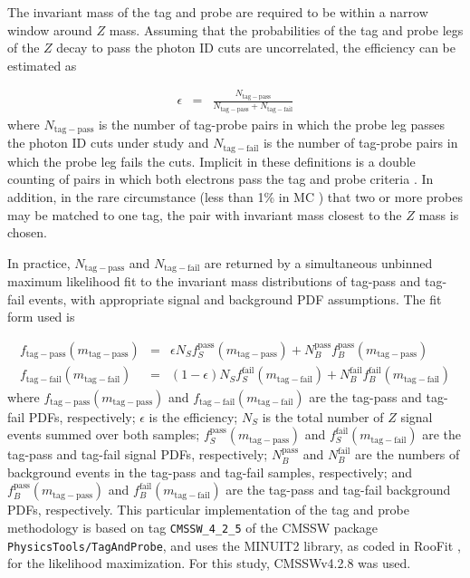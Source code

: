 \documentclass[dissertation.tex]{subfiles}
\begin{document}
The invariant mass of the tag and probe are required to be within a narrow window around $Z$ mass.  Assuming that the probabilities of the tag and probe legs of the $Z$ decay to pass the photon ID cuts are uncorrelated, the efficiency can be estimated as

\begin{eqnarray}
\epsilon &=& \frac{N_{\mathrm{tag-pass}}}{N_{\mathrm{tag-pass}} + N_{\mathrm{tag-fail}}}
\end{eqnarray}
%
where $N_{\mathrm{tag-pass}}$ is the number of tag-probe pairs in which the probe leg passes the photon ID cuts under study and $N_{\mathrm{tag-fail}}$ is the number of tag-probe pairs in which the probe leg fails the cuts.  Implicit in these definitions is a double counting of pairs in which both electrons pass the tag and probe criteria \cite{tag_and_probe_method_AN}.  In addition, in the rare circumstance (less than 1\% in MC \cite{tag_and_probe_method_AN}) that two or more probes may be matched to one tag, the pair with invariant mass closest to the $Z$ mass is chosen.

In practice, $N_{\mathrm{tag-pass}}$ and $N_{\mathrm{tag-fail}}$ are returned by a simultaneous unbinned maximum likelihood fit to the invariant mass distributions of tag-pass and tag-fail events, with appropriate signal and background PDF assumptions.  The fit form used is

\begin{eqnarray}
f_{\mathrm{tag-pass}}(m_{\mathrm{tag-pass}}) &=& \epsilon N_{S}f_{S}^{\mathrm{pass}}(m_{\mathrm{tag-pass}}) + N_{B}^{\mathrm{pass}}f_{B}^{\mathrm{pass}}(m_{\mathrm{tag-pass}})\nonumber \\
f_{\mathrm{tag-fail}}(m_{\mathrm{tag-fail}}) &=& (1 - \epsilon) N_{S}f_{S}^{\mathrm{fail}}(m_{\mathrm{tag-fail}}) + N_{B}^{\mathrm{fail}}f_{B}^{\mathrm{fail}}(m_{\mathrm{tag-fail}})
\end{eqnarray}
%
where $f_{\mathrm{tag-pass}}(m_{\mathrm{tag-pass}})$ and $f_{\mathrm{tag-fail}}(m_{\mathrm{tag-fail}})$ are the tag-pass and tag-fail PDFs, respectively; $\epsilon$ is the efficiency; $N_{S}$ is the total number of $Z$ signal events summed over both samples; $f_{S}^{\mathrm{pass}}(m_{\mathrm{tag-pass}})$ and $f_{S}^{\mathrm{fail}}(m_{\mathrm{tag-fail}})$ are the tag-pass and tag-fail signal PDFs, respectively; $N_{B}^{\mathrm{pass}}$ and $N_{B}^{\mathrm{fail}}$ are the numbers of background events in the tag-pass and tag-fail samples, respectively; and $f_{B}^{\mathrm{pass}}(m_{\mathrm{tag-pass}})$ and $f_{B}^{\mathrm{fail}}(m_{\mathrm{tag-fail}})$ are the tag-pass and tag-fail background PDFs, respectively.  This particular implementation of the tag and probe methodology is based on tag \verb+CMSSW_4_2_5+ of the CMSSW package \verb+PhysicsTools/TagAndProbe+, and uses the MINUIT2 \cite{James1975343} library, as coded in RooFit \cite{RooFit}, for the likelihood maximization.  For this study, CMSSWv4.2.8 was used.
\end{document}
